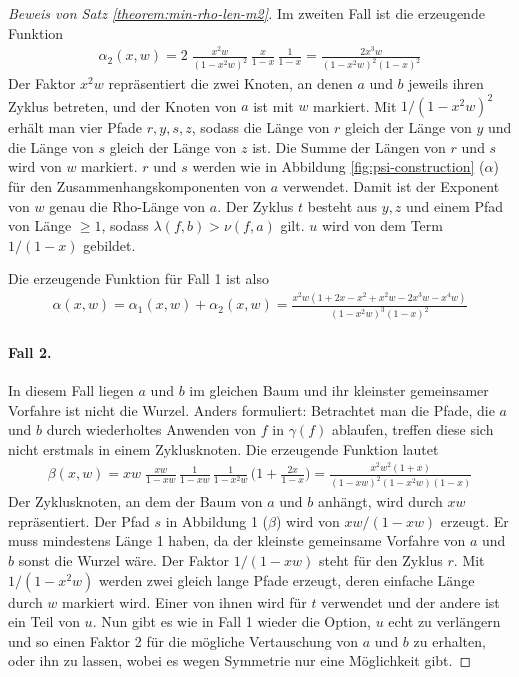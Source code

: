 \documentclass[a4paper, 10pt, ngerman]{article}
\begin{document}
\begin{proof}[Beweis von Satz \ref{theorem:min-rho-len-m2}]
        Im zweiten Fall ist die erzeugende Funktion
        \begin{align*}
            \alpha_2(x, w) =
            2 \; \frac {x^2w} {(1 - x^2w)^2} \, \frac x {1 - x} \,
            \frac {1}{1 - x}
            = \frac {2x^3w} {(1 - x^2w)^2 (1 - x)^2}
        \end{align*}
        Der Faktor $x^2w$ repräsentiert die zwei Knoten, an denen $a$ und $b$ jeweils ihren Zyklus betreten, und der Knoten von $a$ ist mit $w$ markiert. Mit $1 / (1 - x^2w)^2$ erhält man vier Pfade $r, y, s, z$, sodass die Länge von $r$ gleich der Länge von $y$ und die Länge von $s$ gleich der Länge von $z$ ist. Die Summe der Längen von $r$ und $s$ wird von $w$ markiert. $r$ und $s$ werden wie in Abbildung \ref{fig:psi-construction} ($\alpha$) für den Zusammenhangskomponenten von $a$ verwendet. Damit ist der Exponent von $w$ genau die Rho-Länge von $a$. Der Zyklus $t$ besteht aus $y, z$ und einem Pfad von Länge $\ge 1$, sodass $\lambda(f, b) > \nu(f, a)$ gilt. $u$ wird von dem Term $1 / (1 - x)$ gebildet.

        \noindent Die erzeugende Funktion für Fall 1 ist also
        \begin{align*}
            \alpha(x, w)
            = \alpha_1(x, w) + \alpha_2(x, w)
            = \frac {x^2w(1 + 2x - x^2 + x^2w - 2x^3w - x^4w)}
            {(1 - x^2w)^3(1 - x)^2}
        \end{align*}

        \paragraph{Fall 2.}  In diesem Fall liegen $a$ und $b$ im gleichen Baum und ihr kleinster gemeinsamer Vorfahre ist nicht die Wurzel. Anders formuliert: Betrachtet man die Pfade, die $a$ und $b$ durch wiederholtes Anwenden von $f$ in $\gamma(f)$ ablaufen, treffen diese sich nicht erstmals in einem Zyklusknoten. Die erzeugende Funktion lautet
        \begin{align*}
            \beta(x, w)
            = xw \; \frac {xw} {1 - xw} \, \frac {1} {1 - xw} \,
            \frac {1} {1 - x^2w} \, \Bigg (1 + \frac {2x} {1 - x} \Bigg )
            = \frac {x^2w^2(1 + x)} {(1 - xw)^2(1 - x^2w)(1 - x)}
        \end{align*}
        Der Zyklusknoten, an dem der Baum von $a$ und $b$ anhängt, wird durch $xw$ repräsentiert. Der Pfad $s$ in Abbildung 1 ($\beta$) wird von  $xw/(1 - xw)$ erzeugt. Er muss mindestens Länge 1 haben, da der kleinste gemeinsame Vorfahre von $a$ und $b$ sonst die Wurzel wäre. Der Faktor $1/(1 - xw)$ steht für den Zyklus $r$. Mit $1/(1 - x^2w)$ werden zwei gleich lange Pfade erzeugt, deren einfache Länge durch $w$ markiert wird. Einer von ihnen wird für $t$ verwendet und der andere ist ein Teil von $u$. Nun gibt es wie in Fall 1 wieder die Option, $u$ echt zu verlängern und so einen Faktor 2 für die mögliche Vertauschung von $a$ und $b$ zu erhalten, oder ihn zu lassen, wobei es wegen Symmetrie nur eine Möglichkeit gibt.



\end{proof}
\end{document}
